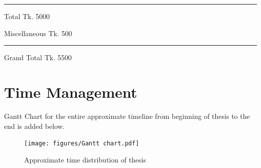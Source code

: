 \rule[0pt]{300pt}{1pt} \par
Total \hspace{190pt} Tk. 5000\par
Miscellaneous \hspace{146pt} Tk. 500\par
\rule[0pt]{300pt}{1pt} \par
Grand Total \hspace{157pt} Tk. 5500\par



\newpage

\section{Time Management}
Gantt Chart for the entire approximate timeline from beginning of thesis to the end is added below.
\begin{figure}[th]
\centering
\texttt{[image: figures/Gantt chart.pdf]}
\caption{Approximate time distribution of thesis }
\label{gantt}
\end{figure}

